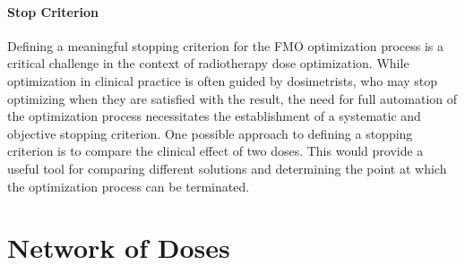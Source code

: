 \paragraph{Stop Criterion}
Defining a meaningful stopping criterion for the FMO optimization process is a critical challenge in the context of radiotherapy dose optimization.
While optimization in clinical practice is often guided by dosimetrists, who may stop optimizing when they are satisfied with the result, the need for full automation of the optimization process necessitates the establishment of a systematic and objective stopping criterion.
One possible approach to defining a stopping criterion is to compare the clinical effect of two doses.
This would provide a useful tool for comparing different solutions and determining the point at which the optimization process can be terminated.






\section{Network of Doses}
